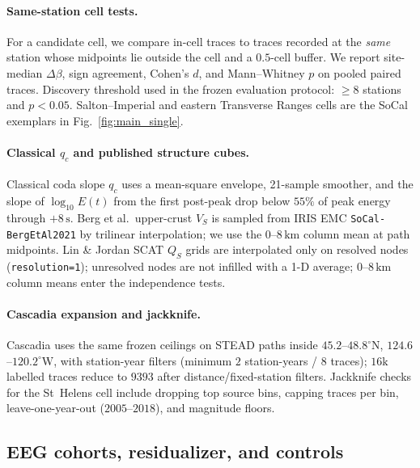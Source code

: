\documentclass[twocolumn, 10pt]{article}
\begin{document}
\paragraph{Same-station cell tests.}
For a candidate cell, we compare in-cell traces to traces recorded at the \emph{same} station whose midpoints lie outside the cell and a \(0.5\)-cell buffer. We report site-median \(\Delta\beta\), sign agreement, Cohen's \(d\), and Mann--Whitney \(p\) on pooled paired traces. Discovery threshold used in the frozen evaluation protocol: \(\ge8\) stations and \(p<0.05\). Salton--Imperial and eastern Transverse Ranges cells are the SoCal exemplars in Fig.~\ref{fig:main_single}.

\paragraph{Classical \(q_c\) and published structure cubes.}
Classical coda slope \(q_c\) uses a mean-square envelope, 21-sample smoother, and the slope of \(\log_{10}E(t)\) from the first post-peak drop below \(55\%\) of peak energy through \(+8\,\mathrm{s}\). Berg et al.\ upper-crust \(V_S\) is sampled from IRIS EMC \texttt{SoCal-BergEtAl2021} by trilinear interpolation; we use the \(0\)--\(8\,\mathrm{km}\) column mean at path midpoints\cite{berg2021}. Lin \& Jordan SCAT \(Q_S\) grids are interpolated only on resolved nodes (\texttt{resolution=1}); unresolved nodes are not infilled with a 1-D average; \(0\)--\(8\,\mathrm{km}\) column means enter the independence tests\cite{lin2023}.

\paragraph{Cascadia expansion and jackknife.}
Cascadia uses the same frozen ceilings on STEAD paths inside \(45.2\)--\(48.8^\circ\mathrm{N}\), \(124.6\)--\(120.2^\circ\mathrm{W}\), with station-year filters (minimum \(2\) station-years / \(8\) traces); \(16\mathrm{k}\) labelled traces reduce to \(9393\) after distance/fixed-station filters. Jackknife checks for the St~Helens cell include dropping top source bins, capping traces per bin, leave-one-year-out (\(2005\)--\(2018\)), and magnitude floors.

\subsection*{EEG cohorts, residualizer, and controls}
\end{document}
